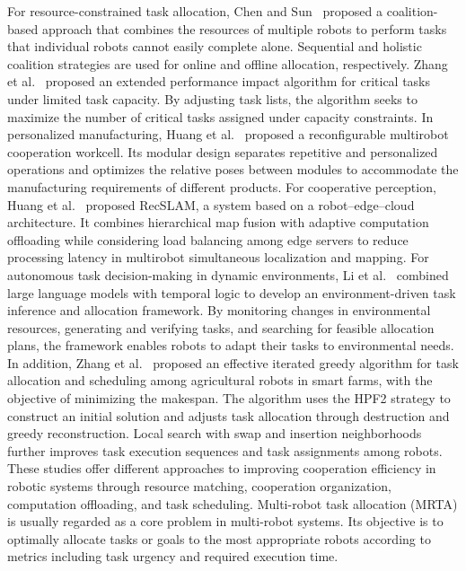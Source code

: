 \documentclass[type=submission,name=IR]{oae}
\begin{document}
 For resource-constrained task allocation, Chen and Sun~\cite{chen_coalition_resources} proposed a coalition-based approach that combines the resources of multiple robots to perform tasks that individual robots cannot easily complete alone. Sequential and holistic coalition strategies are used for online and offline allocation, respectively. Zhang et al.~\cite{zhang_critical_capacity} proposed an extended performance impact algorithm for critical tasks under limited task capacity. By adjusting task lists, the algorithm seeks to maximize the number of critical tasks assigned under capacity constraints. In personalized manufacturing, Huang et al.~\cite{huang_reconfigurable_workcell} proposed a reconfigurable multirobot cooperation workcell. Its modular design separates repetitive and personalized operations and optimizes the relative poses between modules to accommodate the manufacturing requirements of different products. For cooperative perception, Huang et al.~\cite{huang_edge_robotics} proposed RecSLAM, a system based on a robot--edge--cloud architecture. It combines hierarchical map fusion with adaptive computation offloading while considering load balancing among edge servers to reduce processing latency in multirobot simultaneous localization and mapping. For autonomous task decision-making in dynamic environments, Li et al.~\cite{li_llm_task_inference} combined large language models with temporal logic to develop an environment-driven task inference and allocation framework. By monitoring changes in environmental resources, generating and verifying tasks, and searching for feasible allocation plans, the framework enables robots to adapt their tasks to environmental needs. In addition, Zhang et al.~\cite{zhang_iterated_greedy} proposed an effective iterated greedy algorithm for task allocation and scheduling among agricultural robots in smart farms, with the objective of minimizing the makespan. The algorithm uses the HPF2 strategy to construct an initial solution and adjusts task allocation through destruction and greedy reconstruction. Local search with swap and insertion neighborhoods further improves task execution sequences and task assignments among robots. These studies offer different approaches to improving cooperation efficiency in robotic systems through resource matching, cooperation organization, computation offloading, and task scheduling. Multi-robot task allocation (MRTA) is usually regarded as a core problem in multi-robot systems. Its objective is to optimally allocate tasks or goals to the most appropriate robots according to metrics including task urgency and required execution time.
\end{document}
